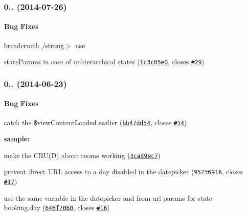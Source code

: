 \label{_0.2.3}%
 \subsubsection*{0.. (2014-\/07-\/26)}

\paragraph*{Bug Fixes}


\begin{DoxyItemize}
\item {\bfseries \begin{DoxyParagraph}{breadcrumb}
/strong$>$ use {\ttfamily }
\end{DoxyParagraph}
state\+Params in case of unhierarchical states (\href{http://github.com/ncuillery/angular-breadcrumb/commit/1c3c05e0acac191fe2e76db2ef18da339caefaaa}{\tt 1c3c05e0}, closes \href{http://github.com/ncuillery/angular-breadcrumb/issues/29}{\tt \#29})}
\end{DoxyItemize}

{\bfseries \label{_0.2.2}%
 \subsubsection*{0.. (2014-\/06-\/23)}}

{\bfseries }

{\bfseries \paragraph*{Bug Fixes}}

{\bfseries }

{\bfseries 
\begin{DoxyItemize}
\item catch the {\ttfamily \$view\+Content\+Loaded} earlier (\href{http://github.com/ncuillery/angular-breadcrumb/commit/bb47dd54deb5efc579ccb9b1575e686803dee1c5}{\tt bb47dd54}, closes \href{http://github.com/ncuillery/angular-breadcrumb/issues/14}{\tt \#14})
\item {\bfseries sample\+:}
\begin{DoxyItemize}
\item make the C\+R\+U(\+D) about rooms working (\href{http://github.com/ncuillery/angular-breadcrumb/commit/3ca89ec771fd20dc4ab2d733612bdcfb96ced703}{\tt 3ca89ec7})
\item prevent direct U\+RL access to a day disabled in the datepicker (\href{http://github.com/ncuillery/angular-breadcrumb/commit/95236916e00b19464a3dfe3584ef1b18da9ffb25}{\tt 95236916}, closes \href{http://github.com/ncuillery/angular-breadcrumb/issues/17}{\tt \#17})
\item use the same variable in the datepicker and from url params for state {\ttfamily booking.\+day} (\href{http://github.com/ncuillery/angular-breadcrumb/commit/646f70607e494f0e5e3c2483ed69f689684b2742}{\tt 646f7060}, closes \href{http://github.com/ncuillery/angular-breadcrumb/issues/16}{\tt \#16})
\end{DoxyItemize}
\end{DoxyItemize}}

